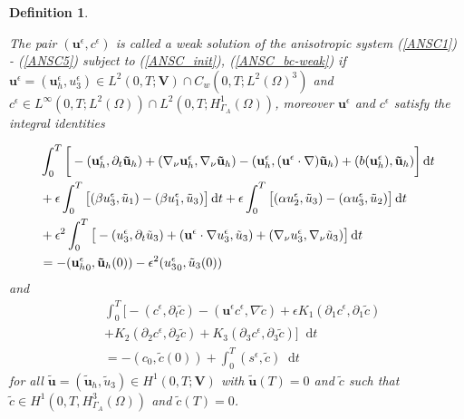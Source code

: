 \documentclass[11pt, a4paper]{article}
\newtheorem{definition}{Definition}
\newcommand*\diff{\mathop{}\!\mathrm{d}}
\begin{document}
\begin{definition} \label{definitionanisotropicWF}

The pair $(\mathbf{u}^\epsilon, c^\epsilon)$ is called a weak solution of the anisotropic system (\ref{ANSC1}) - (\ref{ANSC5}) subject to (\ref{ANSC_init}), (\ref{ANSC_bc-weak}) if $\mathbf{u}^\epsilon = (\mathbf{u}^\epsilon_h, u^\epsilon_3) \in L^2 (0,T ; \mathbf{V}) \cap C_w (0, T; L^2 (\Omega)^3)$ and $c^\epsilon \in L^\infty (0,T; L^2(\Omega)) \cap L^2 (0,T; H_{\Gamma_A}^1(\Omega))$, moreover $\mathbf{u}^\epsilon$ and $c^\epsilon$ satisfy the integral identities

\begin{equation}
\begin{split}
& \int_0^T \bigg [ -(\mathbf{u}^\epsilon_h, \partial_t \mathbf{\tilde{u}}_h) + (\nabla_\nu \mathbf{u}^\epsilon_h, \nabla_\nu \mathbf{\tilde{u}}_h) - (\mathbf{u}^\epsilon_h, (\mathbf{u}^\epsilon \cdot \nabla) \mathbf{\tilde{u}}_h) + (b(\mathbf{u}^\epsilon_h), \mathbf{\tilde{u}}_h) \bigg ] \diff t \\
& + \epsilon \int_0 ^ T \big [ (\beta u_3 ^\epsilon, \tilde{u}_1) - (\beta u_1^\epsilon, \tilde{u}_3) \big ] \diff t + \epsilon \int_0 ^ T \big [ (\alpha u_2 ^\epsilon, \tilde{u}_3) - (\alpha u_3^\epsilon, \tilde{u}_2) \big ] \diff t \\
& + \epsilon^2 \int _0 ^ T \big [ -(u_3^\epsilon, \partial_t \tilde{u}_3) +(\mathbf{u}^\epsilon \cdot \nabla u_3 ^ \epsilon, \tilde{u}_3) + (\nabla_\nu u_3^\epsilon, \nabla_\nu \tilde{u}_3) \big ] \diff t \\
& = - ({\mathbf{u}^\epsilon_h}_0, \mathbf{\tilde{u}}_h(0)) - \epsilon^2 ({u^\epsilon_3}_0, \tilde{u}_3 (0)) \raisetag{20pt} \label{anisotropicWF_u}
\end{split}
\end{equation}
%
and
%
\begin{equation}
\begin{split} 
& \int_0^T \bigg [ -(c^\epsilon, \partial_t \tilde{c}) -(\mathbf{u}^\epsilon c^\epsilon, \nabla \tilde{c}) + \epsilon K_1 (\partial_1 c^\epsilon, \partial_1 \tilde{c}) \\
& + K_2 (\partial_2 c^\epsilon, \partial_2 \tilde{c}) + K_3 (\partial_3 c^\epsilon, \partial_3 \tilde{c}) \bigg ] \diff t \\
& = - (c_0, \tilde{c} (0)) + \int_0^T (s^\epsilon,\tilde{c}) \diff t \label{anisotropicWF_c}
\end{split}
\end{equation}
%
for all $\mathbf{\tilde{u}} = (\mathbf{\tilde{u}}_h, \tilde{u}_3) \in H^1 (0,T;\mathbf{V})$ with $\mathbf{\tilde{u}}(T) = 0$ and $\tilde{c}$ such that $\tilde{c} \in H^1 (0,T, H^3_{\Gamma_A} (\Omega))$ and $\tilde{c} (T) = 0$.

\end{definition}
\end{document}
